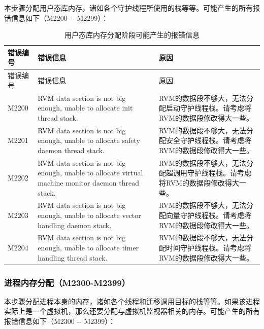 本步骤分配用户态库内存，诸如各个守护线程所使用的栈等等。可能产生的所有报错信息如下（M2200
-\/- M2299）：

\begin{xltabular}{\textwidth}{@{}>{\hsize\raggedright\arraybackslash}X>{\hsize\raggedright\arraybackslash}X>{\hsize\raggedright\arraybackslash}X@{}}
\caption{用户态库内存分配阶段可能产生的报错信息}\label{tab:5-25}\\
\toprule
错误编号 & 错误信息 & 原因\tabularnewline
\endfirsthead
\toprule
错误编号 & 错误信息 & 原因\tabularnewline
\midrule
\endhead
\bottomrule
\endlastfoot
M2200 & RVM data section is not big enough, unable to allocate init
thread stack. &
RVM的数据段不够大，无法分配启动守护线程栈。请考虑将RVM的数据段修改得大一些。\tabularnewline
M2201 & RVM data section is not big enough, unable to allocate safety
daemon thread stack. &
RVM的数据段不够大，无法分配安全守护线程栈。请考虑将RVM的数据段修改得大一些。\tabularnewline
M2202 & RVM data section is not big enough, unable to allocate virtual
machine monitor daemon thread stack. &
RVM的数据段不够大，无法分配超调用守护线程栈。请考虑将RVM的数据段修改得大一些。\tabularnewline
M2203 & RVM data section is not big enough, unable to allocate vector
handling daemon stack. &
RVM的数据段不够大，无法分配向量守护线程栈。请考虑将RVM的数据段修改得大一些。\tabularnewline
M2204 & RVM data section is not big enough, unable to allocate timer
handling thread stack. &
RVM的数据段不够大，无法分配时间守护线程栈。请考虑将RVM的数据段修改得大一些。\tabularnewline
\end{xltabular}

\subsubsection{进程内存分配（M2300-M2399）}\label{subsubsec:5-6-6-4}

本步骤分配进程本身的内存，诸如各个线程和迁移调用目标的栈等等。如果该进程实际上是一个虚拟机，那么还要分配与虚拟机监视器相关的内存。可能产生的所有报错信息如下（M2300
-\/- M2399）：

